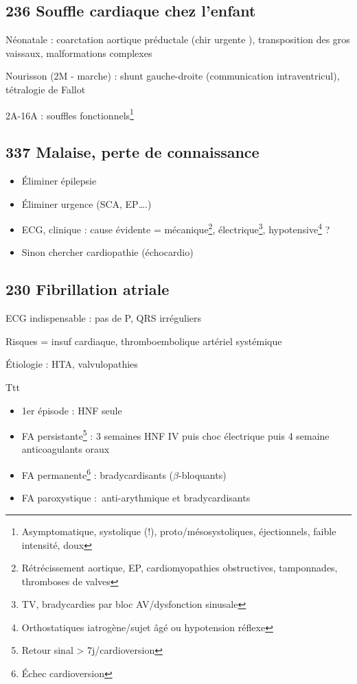 \documentclass[11pt]{article}
\begin{document}
\subsection{236 Souffle cardiaque chez l'enfant}
\label{sec:org8582cd5}
Néonatale : coarctation aortique préductale (chir urgente ), transposition des gros vaissaux,
malformations complexes

Nourisson (2M - marche) : shunt gauche-droite (communication intraventricul), tétralogie de Fallot

2A-16A : souffles fonctionnels\footnote{Asymptomatique, systolique (!), proto/mésosystoliques, éjectionnels,
faible intensité, doux}
\subsection{337 Malaise, perte de connaissance}
\label{sec:org1e40ef4}
\begin{itemize}
\item Éliminer épilepsie
\item Éliminer urgence (SCA, EP\ldots{}.)
\item ECG, clinique : cause évidente = mécanique\footnote{Rétrécissement aortique, EP, cardiomyopathies obstructives, tamponnades, thromboses de valves}, électrique\footnote{TV, bradycardies par bloc AV/dysfonction sinusale}, hypotensive\footnote{Orthostatiques iatrogène/sujet âgé ou hypotension réflexe} ?
\item Sinon chercher cardiopathie  (échocardio)
\end{itemize}
\subsection{230 Fibrillation atriale}
\label{sec:org588e7d7}
ECG indispensable : pas de P, QRS irréguliers

Risques = insuf cardiaque, thromboembolique artériel systémique

Étiologie : HTA, valvulopathies

Ttt 
\begin{itemize}
\item 1er épisode : HNF seule
\item FA persistante\footnote{Retour sinal > 7j/cardioversion} : 3 semaines HNF IV puis choc électrique puis 4 semaine anticoagulants oraux
\item FA permanente\footnote{Échec cardioversion} : bradycardisants (\(\beta\)-bloquants)
\item FA paroxystique : anti-arythmique et bradycardisants
\end{itemize}
\end{document}
